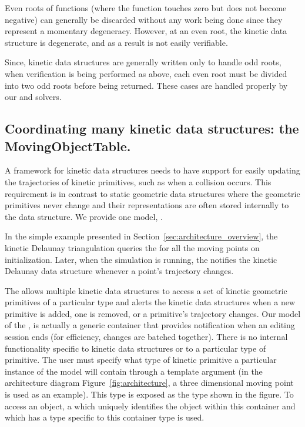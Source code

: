Even roots of functions (where the function touches zero but does
not become negative) can generally be discarded without any work being
done since they represent a momentary degeneracy. However, at an even
root, the kinetic data structure is degenerate, and as a result is not
easily verifiable. 

Since, kinetic data structures are generally written only to handle odd
roots, when verification is being performed as above, each even root
must be divided into two odd roots before being returned. These cases
are handled properly by our  and solvers.

\subsection{Coordinating many kinetic data structures: the MovingObjectTable.}
\label{sec:moving_object_table}

A framework for kinetic data structures needs to have support for
easily updating the trajectories of kinetic primitives, such as when a
collision occurs. This requirement is in contrast to static geometric
data structures where the geometric primitives never change and their
representations are often stored internally to the data structure. We
provide one model, .

In the simple example presented in
Section~\ref{sec:architecture_overview}, the kinetic Delaunay
triangulation queries the  for all the moving points on
initialization. Later, when the simulation is running, the
 notifies the kinetic Delaunay data structure whenever a point's
trajectory changes.

The  allows multiple kinetic data structures to
access a set of kinetic geometric primitives of a particular type and
alerts the kinetic data structures when a new primitive is added, one
is removed, or a primitive's trajectory changes. Our model of the
,  is actually a generic
container that provides notification when an editing session ends (for
efficiency, changes are batched together). There is no internal
functionality specific to kinetic data structures or to a particular
type of primitive. The user must specify what type of kinetic
primitive a particular instance of the  model
will contain through a template argument (in the architecture diagram
Figure~\ref{fig:architecture}, a three dimensional moving point is
used as an example). This type is exposed as the  type
shown in the figure. To access an object, a  which uniquely
identifies the object within this container and which has a type
specific to this container type is used.

